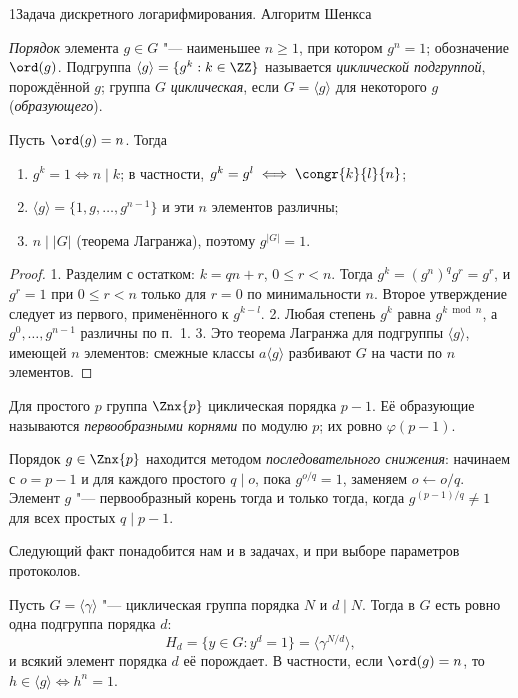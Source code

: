\begin{lecture}{1}{Задача дискретного логарифмирования. Алгоритм Шенкса}
\begin{definition}
\emph{Порядок} элемента $g \in G$ "--- наименьшее $n \ge 1$, при котором $g^n = 1$; обозначение
$\ord(g)$. Подгруппа $\langle g \rangle = \{g^k : k \in \ZZ\}$ называется \emph{циклической
подгруппой}, порождённой $g$; группа $G$ \emph{циклическая}, если $G = \langle g \rangle$ для
некоторого $g$ (\emph{образующего}).
\end{definition}

\begin{proposition}\label{l1:order}
Пусть $\ord(g) = n$. Тогда
\begin{enumerate}
  \item $g^k = 1 \iff n \mid k$; в частности, $g^k = g^l \iff \congr{k}{l}{n}$;
  \item $\langle g \rangle = \{1, g, \dots, g^{n-1}\}$ и эти $n$ элементов различны;
  \item $n \mid |G|$ (теорема Лагранжа), поэтому $g^{|G|} = 1$.
\end{enumerate}
\end{proposition}

\begin{proof}
1. Разделим с остатком: $k = qn + r$, $0 \le r < n$. Тогда $g^k = (g^n)^q g^r = g^r$, и
$g^r = 1$ при $0 \le r < n$ только для $r = 0$ по минимальности $n$. Второе утверждение
следует из первого, применённого к $g^{k - l}$.
2. Любая степень $g^k$ равна $g^{k \bmod n}$, а $g^0, \dots, g^{n-1}$ различны по п.~1.
3. Это теорема Лагранжа для подгруппы $\langle g \rangle$, имеющей $n$ элементов: смежные классы
$a\langle g \rangle$ разбивают $G$ на части по $n$ элементов.
\end{proof}

\begin{theorem}\label{l1:cyclic}
Для простого $p$ группа $\Znx{p}$ циклическая порядка $p - 1$. Её образующие называются
\emph{первообразными корнями} по модулю $p$; их ровно $\varphi(p - 1)$.
\end{theorem}

Порядок $g \in \Znx{p}$ находится методом \emph{последовательного снижения}: начинаем
с $o = p - 1$ и для каждого простого $q \mid o$, пока $g^{o/q} = 1$, заменяем $o \gets o/q$.
Элемент $g$ "--- первообразный корень тогда и только тогда, когда $g^{(p-1)/q} \ne 1$ для всех
простых $q \mid p - 1$.

Следующий факт понадобится нам и в задачах, и при выборе параметров протоколов.

\begin{proposition}\label{l1:subgroups}
Пусть $G = \langle \gamma \rangle$ "--- циклическая группа порядка $N$ и $d \mid N$. Тогда
в $G$ есть ровно одна подгруппа порядка $d$:
\[
  H_d = \{y \in G : y^d = 1\} = \langle \gamma^{N/d} \rangle,
\]
и всякий элемент порядка $d$ её порождает. В частности, если $\ord(g) = n$, то $h \in \langle g
\rangle \iff h^n = 1$.
\end{proposition}


\end{lecture}
